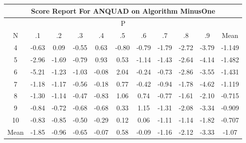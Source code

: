 \documentclass[11pt,a4paper]{report}
\begin{document}
\begin{longtable}{ | c || c | c | c | c | c | c | c | c | c || c |}
\hline
\multicolumn{11}{|c|}{ Score Report For ANQUAD on Algorithm MinusOne} \\
\hline
\multicolumn{11}{|c|}{ P } \\
\hline
N & .1 & .2 & .3 & .4 & .5 & .6 & .7 & .8 & .9 & Mean\\
 \hline
 \hline
 \endhead
  4 &  \cellcolor[HTML]{FFEFEF} -0.63 &  \cellcolor[HTML]{FFFFFF} 0.09 &  \cellcolor[HTML]{FFEFEF} -0.55 &  \cellcolor[HTML]{EFEFFF} 0.63 &  \cellcolor[HTML]{FFE7E7} -0.80 &  \cellcolor[HTML]{FFEFEF} -0.79 &  \cellcolor[HTML]{FFCFCF} -1.79 &  \cellcolor[HTML]{FFB7B7} -2.72 &  \cellcolor[HTML]{FF9F9F} -3.79 & -1.149 \\
  5 &  \cellcolor[HTML]{FFB7B7} -2.96 &  \cellcolor[HTML]{FFD7D7} -1.69 &  \cellcolor[HTML]{FFEFEF} -0.79 &  \cellcolor[HTML]{E7E7FF} 0.93 &  \cellcolor[HTML]{EFEFFF} 0.53 &  \cellcolor[HTML]{FFDFDF} -1.14 &  \cellcolor[HTML]{FFD7D7} -1.43 &  \cellcolor[HTML]{FFBFBF} -2.64 &  \cellcolor[HTML]{FF9797} -4.14 & -1.482 \\
  6 &  \cellcolor[HTML]{FF8080} -5.21 &  \cellcolor[HTML]{FFDFDF} -1.23 &  \cellcolor[HTML]{FFE7E7} -1.03 &  \cellcolor[HTML]{FFFFFF} -0.08 &  \cellcolor[HTML]{CFCFFF} 2.04 &  \cellcolor[HTML]{FFF7F7} -0.24 &  \cellcolor[HTML]{FFEFEF} -0.73 &  \cellcolor[HTML]{FFB7B7} -2.86 &  \cellcolor[HTML]{FFA7A7} -3.55 & -1.431 \\
  7 &  \cellcolor[HTML]{FFDFDF} -1.18 &  \cellcolor[HTML]{FFDFDF} -1.17 &  \cellcolor[HTML]{FFEFEF} -0.56 &  \cellcolor[HTML]{FFF7F7} -0.18 &  \cellcolor[HTML]{EFEFFF} 0.77 &  \cellcolor[HTML]{FFF7F7} -0.42 &  \cellcolor[HTML]{FFE7E7} -0.94 &  \cellcolor[HTML]{FFCFCF} -1.78 &  \cellcolor[HTML]{FF8787} -4.62 & -1.119 \\
  8 &  \cellcolor[HTML]{FFDFDF} -1.30 &  \cellcolor[HTML]{FFDFDF} -1.14 &  \cellcolor[HTML]{FFF7F7} -0.47 &  \cellcolor[HTML]{FFE7E7} -0.83 &  \cellcolor[HTML]{E7E7FF} 1.06 &  \cellcolor[HTML]{EFEFFF} 0.74 &  \cellcolor[HTML]{FFEFEF} -0.77 &  \cellcolor[HTML]{FFD7D7} -1.61 &  \cellcolor[HTML]{FFC7C7} -2.10 & -0.715 \\
  9 &  \cellcolor[HTML]{FFE7E7} -0.84 &  \cellcolor[HTML]{FFEFEF} -0.72 &  \cellcolor[HTML]{FFEFEF} -0.68 &  \cellcolor[HTML]{FFEFEF} -0.68 &  \cellcolor[HTML]{F7F7FF} 0.33 &  \cellcolor[HTML]{DFDFFF} 1.15 &  \cellcolor[HTML]{FFDFDF} -1.31 &  \cellcolor[HTML]{FFC7C7} -2.08 &  \cellcolor[HTML]{FFA7A7} -3.34 & -0.909 \\
  10 &  \cellcolor[HTML]{FFE7E7} -0.83 &  \cellcolor[HTML]{FFE7E7} -0.85 &  \cellcolor[HTML]{FFEFEF} -0.50 &  \cellcolor[HTML]{FFF7F7} -0.29 &  \cellcolor[HTML]{FFFFFF} 0.12 &  \cellcolor[HTML]{FFFFFF} 0.06 &  \cellcolor[HTML]{FFE7E7} -1.11 &  \cellcolor[HTML]{FFDFDF} -1.14 &  \cellcolor[HTML]{FFCFCF} -1.82 & -0.707 \\
 \hline
 \hline
Mean &  \cellcolor[HTML]{FFCFCF} -1.85 &  \cellcolor[HTML]{FFE7E7} -0.96 &  \cellcolor[HTML]{FFEFEF} -0.65 &  \cellcolor[HTML]{FFFFFF} -0.07 &  \cellcolor[HTML]{EFEFFF} 0.58 &  \cellcolor[HTML]{FFFFFF} -0.09 &  \cellcolor[HTML]{FFDFDF} -1.16 &  \cellcolor[HTML]{FFC7C7} -2.12 &  \cellcolor[HTML]{FFA7A7} -3.33 &  \cellcolor[HTML]{FFE7E7} -1.07
\end{longtable}
\end{document}
